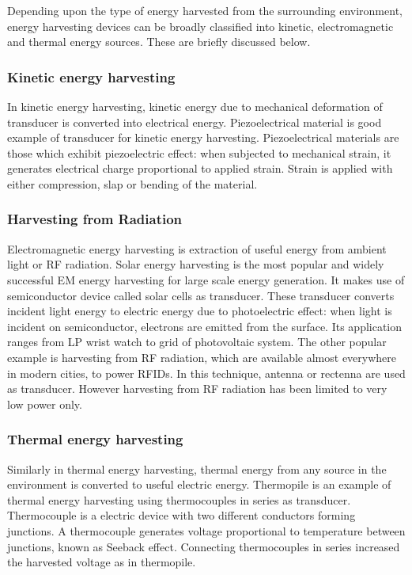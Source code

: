 \documentclass[12pt,a4paper,UKenglish]{article}
\begin{document}
Depending upon the type of energy harvested from the surrounding environment, energy harvesting devices can be 
broadly classified into kinetic, electromagnetic and thermal energy sources\cite{review_energy_harvest}. These are 
briefly discussed below.\\

\subsubsection{Kinetic energy harvesting}
In kinetic energy harvesting, kinetic energy due to mechanical deformation of transducer is converted into 
electrical energy. Piezoelectrical material is good example of transducer for kinetic energy harvesting. 
Piezoelectrical materials are those which exhibit piezoelectric effect: when subjected to mechanical strain, 
it generates electrical charge proportional to applied strain. Strain is applied with either compression, slap 
or bending of the material. \\


\subsubsection{Harvesting from Radiation}
Electromagnetic energy harvesting is extraction of useful energy from ambient light or RF radiation. Solar energy 
harvesting is the most popular and widely successful EM energy harvesting for large scale energy generation. It 
makes use of semiconductor device called solar cells as transducer. These transducer converts incident light 
energy to electric energy due to photoelectric effect: when light is incident on semiconductor, electrons are 
emitted from the surface.  Its application ranges from LP wrist watch to grid of photovoltaic system. The other 
popular example is harvesting from  RF radiation, which are available almost everywhere in modern cities, to 
power RFIDs. In this technique, antenna or rectenna are used as transducer. However harvesting from RF radiation 
has been limited to very low power only. \\

\subsubsection{Thermal energy harvesting}
Similarly in thermal energy harvesting, thermal energy from any source in the environment is converted to useful 
electric energy. Thermopile is an example of thermal energy harvesting using thermocouples in series as 
transducer. Thermocouple is a electric device with two different conductors forming junctions. A thermocouple 
generates voltage proportional to temperature between junctions, known as Seeback effect. Connecting 
thermocouples in series increased the harvested voltage as in thermopile. \\
\end{document}
